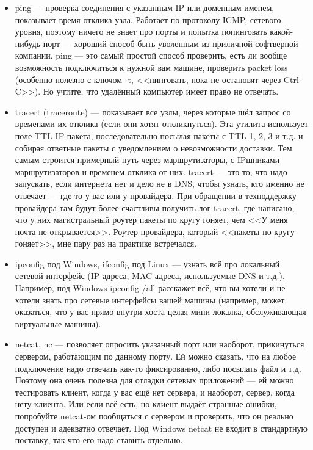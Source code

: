 \documentclass{../../text-style}
\begin{document}
\begin{itemize}
    \item ping --- проверка соединения с указанным IP или доменным именем, показывает время отклика узла. Работает по протоколу ICMP, сетевого уровня, поэтому ничего не знает про порты и попытка попинговать какой-нибудь порт --- хороший способ быть уволенным из приличной софтверной компании. ping --- это самый простой способ проверить, есть ли вообще возможность подключиться к нужной вам машине, проверить packet loss (особенно полезно с ключом -t, <<пинговать, пока не остановят через Ctrl-C>>). Но учтите, что удалённый компьютер имеет право не отвечать.
    \item tracert (traceroute) --- показывает все узлы, через которые шёл запрос со временами их отклика (если они хотят откликнуться). Эта утилита использует поле TTL IP-пакета, последовательно посылая пакеты с TTL 1, 2, 3 и т.д. и собирая ответные пакеты с уведомлением о невозможности доставки. Тем самым строится примерный путь через маршрутизаторы, с IPшниками маршрутизаторов и временем отклика от них. tracert --- это то, что надо запускать, если интернета нет и дело не в DNS, чтобы узнать, кто именно не отвечает --- где-то у вас или у провайдера. При обращении в техподдержку провайдера там будут более счастливы получить лог tracert, где написано, что у них магистральный роутер пакеты по кругу гоняет, чем <<У меня почта не открывается>>. Роутер провайдера, который <<пакеты по кругу гоняет>>, мне пару раз на практике встречался.
    \item ipconfig под Windows, ifconfig под Linux --- узнать всё про локальный сетевой интерфейс (IP-адреса, MAC-адреса, используемые DNS и т.д.). Например, под Windows ipconfig /all расскажет всё, что вы хотели и не хотели знать про сетевые интерфейсы вашей машины (например, может оказаться, что у вас прямо внутри хоста целая мини-локалка, обслуживающая виртуальные машины).
    \item netcat, nc --- позволяет опросить указанный порт или наоборот, прикинуться сервером, работающим по данному порту. Ей можно сказать, что на любое подключение надо отвечать как-то фиксированно, либо посылать файл и т.д. Поэтому она очень полезна для отладки сетевых приложений --- ей можно тестировать клиент, когда у вас ещё нет сервера, и наоборот, сервер, когда нету клиента. Или если всё есть, но клиент выдаёт странные ошибки, попробуйте netcat-ом пообщаться с сервером и проверить, что он реально доступен и адекватно отвечает. Под Windows netcat не входит в стандартную поставку, так что его надо ставить отдельно.

\end{itemize}
\end{document}
